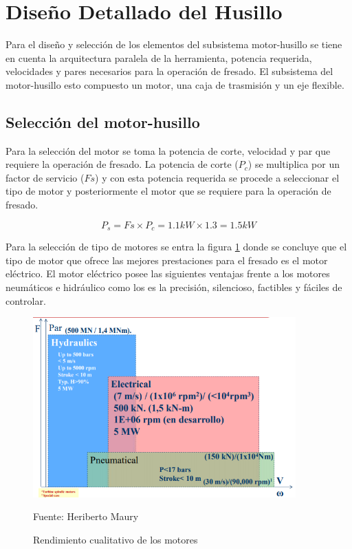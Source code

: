 \section{Diseño Detallado del Husillo}
Para el diseño y selección de los elementos del subsistema motor-husillo se tiene en cuenta la arquitectura paralela de la herramienta, potencia requerida, velocidades y pares necesarios para la operación de fresado. El subsistema del motor-husillo esto compuesto un motor, una caja de trasmisión y un eje flexible.

\subsection{Selección del motor-husillo}
Para la selección del motor se toma la potencia de corte, velocidad y par que requiere la operación de fresado. La potencia de corte ($P_{c}$) se multiplica por un factor de servicio ($Fs$) y con esta potencia requerida se procede a seleccionar el tipo de motor y posteriormente el motor que se requiere para la operación de fresado.

\begin{equation}
P_{s}=Fs\times P_{c}=1.1kW\times1.3=1.5 kW
\end{equation}

Para la selección de tipo de motores se entra la figura \ref{fig:Seleccion_M} donde se concluye que el tipo de motor que ofrece las mejores prestaciones para el fresado es el motor eléctrico. El motor eléctrico posee las siguientes ventajas frente a los motores neumáticos e hidráulico como los es la precisión, silencioso, factibles y fáciles de controlar.

\begin{figure}[ht]
    \centering
    \includegraphics[width =0.9\textwidth]{Cap5_DisenoDetallado/Figuras/Seleccion_M.PNG}
    \caption{Rendimiento cualitativo de los motores}{Fuente: Heriberto Maury}
    \label{fig:Seleccion_M}
\end{figure}

